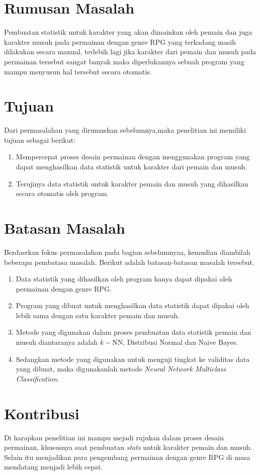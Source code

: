 \section{Rumusan Masalah}
\vspace{1ex}

Pembuatan statistik untuk karakter yang akan dimainkan oleh pemain dan juga karakter musuh pada permainan dengan genre RPG yang terkadang masih dilakukan secara manual, terlebih lagi jika karakter dari pemain dan musuh pada permainan tersebut sangat banyak maka diperlukannya sebuah program yang mampu menyusun hal tersebut secara otomatis.
\vspace{1ex}

\section{Tujuan}
\vspace{1ex}

Dari permasalahan yang dirumuskan sebelumnya,maka penelitian ini memiliki tujuan sebagai berikut: 

\begin{enumerate}
	\item Mempercepat proses desain permainan dengan menggunakan program yang dapat menghasilkan data statistik untuk karakter dari pemain dan musuh.

	\item Terujinya data statistik untuk karakter pemain dan musuh yang dihasilkan secara otomatis oleh program.
\end{enumerate}

\section{Batasan Masalah}
\vspace{1ex}

Berdasrkan fokus permasalahan pada bagian sebelumnyaa, kemudian diambilah beberapa pembatasa masalah. Berikut adalah batasan-batasan masalah tersebut.

\begin{enumerate}
	\item Data statistik yang dihasilkan oleh program hanya dapat dipakai oleh permainan dengan genre RPG.
	
	\item Program yang dibuat untuk menghasilkan data statistik dapat dipakai oleh lebih sama dengan satu karakter pemain dan musuh.

	\item Metode yang digunakan dalam proses pembuatan data statistik pemain dan musuh diantaranya adalah $k-$NN, Distribusi Normal dan Naive Bayes.
	
	\item Sedangkan metode yang digunakan untuk menguji tingkat ke validitas data yang dibuat, maka digunakanlah metode \textit{Neural Network Multiclass Classification}.
\end{enumerate}

\section{Kontribusi}
\vspace{1ex}

Di harapkan penelitian ini mampu mejadi rujukan dalam proses desain permainan, khususnya saat pembuatan \textit{stats} untuk karakter pemain dan musuh. Selain itu menjadikan para pengembang permainan dengan genre RPG di masa mendatang menjadi lebih cepat.
